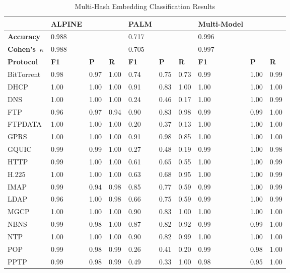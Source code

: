 \begin{table}
\caption{Multi-Hash Embedding Classification Results}
\centering
\begin{tabular}{| p{2cm} | p{0.6cm} p{0.6cm} p{0.6cm} || p{0.6cm} p{0.6cm} p{0.6cm} || p{0.6cm} p{0.6cm} p{0.6cm}|}
\hline
& \textbf{ALPINE} & & & \textbf{PALM} & & & \textbf{Multi-Model} & & \\
\hline
\hline
\textbf{Accuracy} & 0.988 & & & 0.717 & & & 0.996 & & \\
\textbf{Cohen's~$\kappa$} & 0.988 & & & 0.705 & & & 0.997 & & \\
\hline
\hline
 \textbf{Protocol} & \textbf{F1} & \textbf{P} & \textbf{R} & \textbf{F1} & \textbf{P} & \textbf{R} & \textbf{F1} & \textbf{P} & \textbf{R} \\
 \hline
 BitTorrent & 0.98 & 0.97 & 1.00 & 0.74 & 0.75 & 0.73 & 0.99 & 1.00 & 0.99 \\
 DHCP & 1.00 & 1.00 & 1.00 & 0.91 & 0.83 & 1.00 & 1.00 & 1.00 & 1.00 \\
 DNS & 1.00 & 1.00 & 1.00 & 0.24 & 0.46 & 0.17 & 1.00 & 1.00 & 0.99 \\
 FTP & 0.96 & 0.97 &  0.94 & 0.90 & 0.83 & 0.98 & 0.99 & 0.99 & 1.00 \\
 FTPDATA & 1.00 & 1.00 & 1.00 & 0.20 & 0.37 & 0.13 & 1.00 & 1.00 & 1.00 \\
 GPRS & 1.00 & 1.00 & 1.00 & 0.91 & 0.98 & 0.85 & 1.00 & 1.00 & 1.00 \\
 GQUIC & 0.99 & 0.99 & 1.00 & 0.27 & 0.48 & 0.19 & 0.99 & 1.00 & 0.98 \\
 HTTP & 0.99 & 1.00 & 1.00 & 0.61 & 0.65 & 0.55 & 1.00 & 1.00 & 0.99 \\
 H.225 & 1.00 & 1.00 & 1.00 & 0.63 & 0.68 & 0.95 & 1.00 & 1.00 & 0.99 \\
 IMAP & 0.99 & 0.94 & 0.98 & 0.85 & 0.77 & 0.59 & 0.99 & 1.00 & 0.99 \\
 LDAP & 0.96 & 1.00 & 0.98 & 0.66 & 0.75 & 0.59 & 0.99 & 1.00 & 0.99 \\
 MGCP & 1.00 & 1.00 & 1.00 & 0.90 & 0.83 & 1.00 & 1.00 & 1.00 & 1.00 \\
 NBNS & 0.99 & 0.98 & 1.00 & 0.87 & 0.82 & 0.92 & 0.99 & 0.99 & 1.00 \\
 NTP & 1.00 & 1.00 & 1.00 & 0.90 & 0.82 & 0.99 & 1.00 & 1.00 & 1.00 \\
 POP & 0.99 & 0.98 & 0.99 & 0.26 & 0.41 & 0.20 & 0.99 & 0.98 & 1.00 \\
 PPTP & 0.99 & 0.98 & 0.99 & 0.49 & 0.33 & 1.00 & 0.98 & 0.95 & 1.00 \\

\end{tabular}
\end{table}
